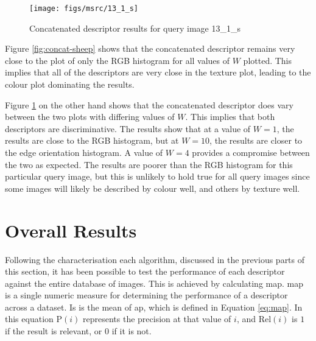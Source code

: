 \begin{figure}[ht]
	\begin{minipage}[]{0.3\linewidth}
		\centering
		\texttt{[image: figs/msrc/13\_1\_s]}
	\end{minipage}
	\begin{minipage}[]{0.7\linewidth}
		\centering
	\end{minipage}
	\caption{Concatenated descriptor results for query image 13\_1\_s}
	\label{fig:concat-books}
\end{figure}

Figure \ref{fig:concat-sheep} shows that the concatenated descriptor remains very close to the plot of only the RGB histogram for all values of $W$ plotted. This implies that all of the descriptors are very close in the texture plot, leading to the colour plot dominating the results.

Figure \ref{fig:concat-books} on the other hand shows that the concatenated descriptor does vary between the two plots with differing values of $W$. This implies that both descriptors are discriminative. The results show that at a value of $W=1$, the results are close to the RGB histogram, but at $W=10$, the results are closer to the edge orientation histogram. A value of $W=4$ provides a compromise between the two as expected. The results are poorer than the RGB histogram for this particular query image, but this is unlikely to hold true for all query images since some images will likely be described by colour well, and others by texture well.

\section{Overall Results} \label{sec:overall-results}

Following the characterisation each algorithm, discussed in the previous parts of this section, it has been possible to test the performance of each descriptor against the entire database of images. This is achieved by calculating \gls{map}. \gls{map} is a single numeric measure for determining the performance of a descriptor across a dataset. Is is the mean of \gls{ap}, which is defined in Equation \ref{eq:map}. In this equation P$(i)$ represents the precision at that value of $i$, and Rel$(i)$ is $1$ if the result is relevant, or $0$ if it is not.

